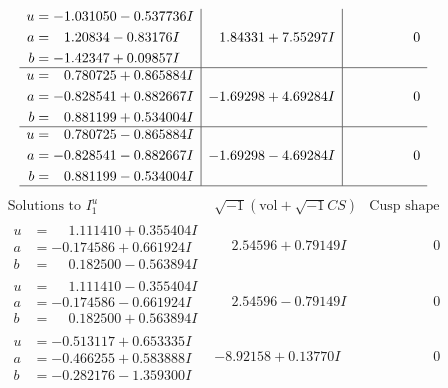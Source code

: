 \documentclass[1p]{elsarticle_modified}
\theoremstyle{definition}
\newcommand{\I}{\sqrt{-1}}
\begin{document}
$$\begin{array}{c|c|c}
\begin{aligned}
u &= -1.031050 - 0.537736 I \\
a &= \phantom{-}1.20834 - 0.83176 I \\
b &= -1.42347 + 0.09857 I\end{aligned}
 & \phantom{-}1.84331 + 7.55297 I & \phantom{-0.000000 } 0 \\ \hline\begin{aligned}
u &= \phantom{-}0.780725 + 0.865884 I \\
a &= -0.828541 + 0.882667 I \\
b &= \phantom{-}0.881199 + 0.534004 I\end{aligned}
 & -1.69298 + 4.69284 I & \phantom{-0.000000 } 0 \\ \hline\begin{aligned}
u &= \phantom{-}0.780725 - 0.865884 I \\
a &= -0.828541 - 0.882667 I \\
b &= \phantom{-}0.881199 - 0.534004 I\end{aligned}
 & -1.69298 - 4.69284 I & \phantom{-0.000000 } 0\\
 \hline 
 \end{array}$$\newpage$$\begin{array}{c|c|c}  
\text{Solutions to }I^u_{1}& \I (\text{vol} + \sqrt{-1}CS) & \text{Cusp shape}\\
 \hline 
\begin{aligned}
u &= \phantom{-}1.111410 + 0.355404 I \\
a &= -0.174586 + 0.661924 I \\
b &= \phantom{-}0.182500 - 0.563894 I\end{aligned}
 & \phantom{-}2.54596 + 0.79149 I & \phantom{-0.000000 } 0 \\ \hline\begin{aligned}
u &= \phantom{-}1.111410 - 0.355404 I \\
a &= -0.174586 - 0.661924 I \\
b &= \phantom{-}0.182500 + 0.563894 I\end{aligned}
 & \phantom{-}2.54596 - 0.79149 I & \phantom{-0.000000 } 0 \\ \hline\begin{aligned}
u &= -0.513117 + 0.653335 I \\
a &= -0.466255 + 0.583888 I \\
b &= -0.282176 - 1.359300 I\end{aligned}
 & -8.92158 + 0.13770 I & \phantom{-0.000000 } 0 \\ \hline\begin{aligned}

\end{aligned}
\end{array}$$
\end{document}
